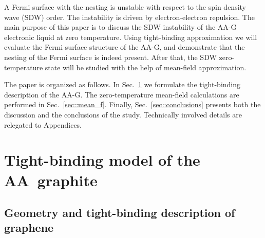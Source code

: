 \documentclass[prb,twocolumn,showpacs,aps,superscriptaddress,floatfix]{revtex4}
\begin{document}
A Fermi surface with the nesting is unstable with respect to the spin
density wave (SDW) order. The instability is driven by electron-electron
repulsion. The main purpose of this paper is to discuss the SDW instability
of the AA-G electronic liquid at zero temperature. Using tight-binding
approximation we will evaluate the Fermi surface structure of the AA-G, and
demonstrate that the nesting of the Fermi surface is indeed present. After
that, the SDW zero-temperature state will be studied with the help of
mean-field approximation.

The paper is organized as follows. In
Sec.~\ref{sec::tb}
we formulate the tight-binding description of the AA-G. The
zero-temperature mean-field calculations are performed in
Sec.~\ref{sec::mean_f}.
Finally,
Sec.~\ref{sec::conclusions}
presents both the discussion and the conclusions of the study. Technically
involved details are relegated to Appendices.

\section{Tight-binding model of the AA~graphite}
\label{sec::tb}

\subsection{Geometry and tight-binding description of graphene}
\end{document}
